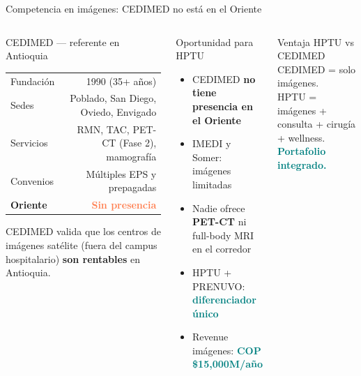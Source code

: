 \documentclass[aspectratio=169, 11pt]{beamer}
\newcommand{\highlight}[1]{\textcolor{teal}{\textbf{#1}}}
\newcommand{\danger}[1]{\textcolor{coral}{\textbf{#1}}}
\newcommand{\src}[1]{\par\vspace{2pt}{\tiny\textcolor{slate}{Fuente: #1}}}
\begin{document}
\begin{frame}{Competencia en imágenes: CEDIMED no está en el Oriente}

\begin{columns}[T]
\begin{block}{\small CEDIMED --- referente en Antioquia}
\footnotesize
\begin{tabular}{@{}lr@{}}
\toprule
Fundación & 1990 (35+ años) \\
Sedes & Poblado, San Diego, Oviedo, Envigado \\
Servicios & RMN, TAC, PET-CT (Fase 2), mamografía \\
Convenios & Múltiples EPS y prepagadas \\
\rowcolor{coral!10}
\textbf{Oriente} & \danger{Sin presencia} \\
\bottomrule
\end{tabular}

\vspace{4pt}
{\scriptsize CEDIMED valida que los centros de imágenes satélite (fuera del campus hospitalario) \textbf{son rentables} en Antioquia.}
\end{block}

\begin{exampleblock}{\small Oportunidad para HPTU}
\footnotesize
\begin{itemize}\setlength{\itemsep}{1pt}
  \item CEDIMED \textbf{no tiene presencia en el Oriente}
  \item IMEDI y Somer: imágenes limitadas
  \item Nadie ofrece \textbf{PET-CT} ni full-body MRI en el corredor
  \item HPTU + PRENUVO: \highlight{diferenciador único}
  \item Revenue imágenes: \highlight{COP \$15,000M/año}
\end{itemize}
\end{exampleblock}

\vspace{2pt}
\begin{alertblock}{\small Ventaja HPTU vs CEDIMED}
\centering\scriptsize
CEDIMED = solo imágenes.\\
HPTU = imágenes + consulta + cirugía + wellness.\\
\highlight{Portafolio integrado.}
\end{alertblock}
\end{columns}

\src{CEDIMED.com.co, Torre Médica Oviedo comunicado 2025}
\end{frame}
\end{document}
